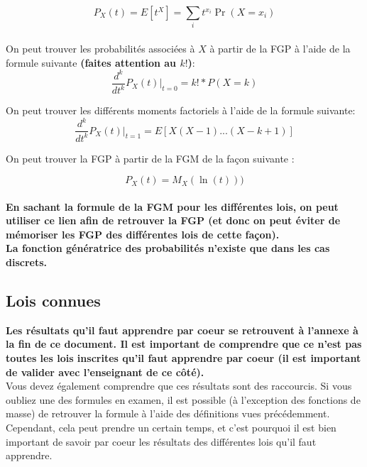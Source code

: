 \documentclass[10pt, french]{article}
\begin{document}
\begin{multicols*}{2}
\begin{definitionNOHFILLprop}

$$P_X(t) = E[t^X]=\sum_i t^{x_i} \Pr(X = x_i)$$\\

On peut trouver les probabilités associées à $X$ à partir de la FGP à l'aide de la formule suivante \textbf{(faites attention au $k!$)}:
$$\frac{d^k}{dt^k}P_X(t) \bigg\rvert_{t=0} = k! *P(X =k) $$
    
On peut trouver les différents moments factoriels à l'aide de la formule suivante:
$$\frac{d^k}{dt^k}P_X(t) \bigg\rvert_{t=1} = E[X(X-1)...(X - k + 1)]$$

On peut trouver la FGP à partir de la FGM de la façon suivante :

$$P_X(t) = M_X(\ln(t)))$$\\

\textbf{En sachant la formule de la FGM pour les différentes lois, on peut utiliser ce lien afin de retrouver la FGP (et donc on peut éviter de mémoriser les FGP des différentes lois de cette façon).}\\

\textbf{La fonction génératrice des probabilités n'existe que dans les cas discrets.}

\end{definitionNOHFILLprop}

\subsection{Lois connues}

\begin{definitionNOHFILL}

\textbf{Les résultats qu'il faut apprendre par coeur se retrouvent à l'annexe à la fin de ce document. Il est important de comprendre que ce n'est pas toutes les lois inscrites qu'il faut apprendre par coeur (il est important de valider avec l'enseignant de ce côté).}\\

Vous devez également comprendre que ces résultats sont des raccourcis. Si vous oubliez une des formules en examen, il est possible (à l'exception des fonctions de masse) de retrouver la formule à l'aide des définitions vues précédemment. Cependant, cela peut prendre un certain temps, et c'est pourquoi il est bien important de savoir par coeur les résultats des différentes lois qu'il faut apprendre.  


\end{definitionNOHFILL}
\end{multicols*}
\end{document}
